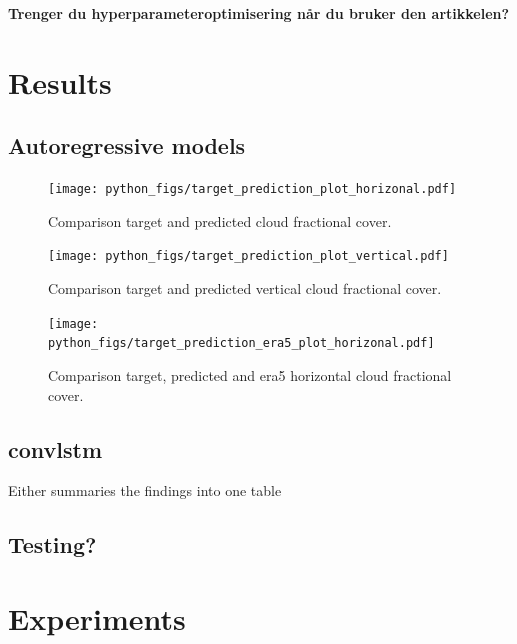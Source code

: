 \textbf{Trenger du hyperparameteroptimisering når du bruker den artikkelen?}

\section{Results}

\subsection{Autoregressive models}

\begin{figure}[ht]
    \centering
    \texttt{[image: python\_figs/target\_prediction\_plot\_horizonal.pdf]}
    \caption{Comparison target and predicted cloud fractional cover.}
    \label{fig:target_predict_horizontal}
\end{figure}

\begin{figure}[ht]
    \centering
    \texttt{[image: python\_figs/target\_prediction\_plot\_vertical.pdf]}
    \caption{Comparison target and predicted vertical cloud fractional cover.}
    \label{fig:target_predict_vertical}
\end{figure}

\begin{figure}[ht]
    \centering
    \texttt{[image: python\_figs/target\_prediction\_era5\_plot\_horizonal.pdf]}
    \caption{Comparison target, predicted and era5 horizontal cloud fractional cover.}
    \label{fig:target_predict_era5_vertical}
\end{figure}

\subsection{\acrlong{convlstm} }
Either summaries the findings into one table 


\subsection{Testing?}

\section{Experiments}



